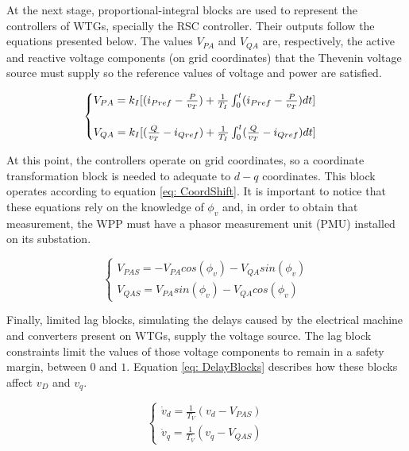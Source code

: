At the next stage, proportional-integral blocks are used to represent the controllers of WTGs, specially the RSC controller. Their outputs follow the equations presented below. The values $V_{PA}$ and $V_{QA}$ are, respectively, the active and reactive voltage components (on grid coordinates) that the Thevenin voltage source must supply so the reference values of voltage and power are satisfied.

\begin{equation}
	\begin{cases}
		V_{PA} = k_{I}[(i_{Pref} - \frac{P}{v_{T}}) + \frac{1}{T_{I}}\int\displaylimits_{0}^{t} (i_{Pref} - \frac{P}{v_{T}})dt]\\
		\\
		V_{QA} = k_{I}[(\frac{Q}{v_{T}} - i_{Qref}) + \frac{1}{T_{I}}\int\displaylimits_{0}^{t} (\frac{Q}{v_{T}} - i_{Qref})dt]
	\end{cases}
	\label{eq: PI}
\end{equation}

At this point, the controllers operate on grid coordinates, so a coordinate transformation block is needed to adequate to $d-q$ coordinates. This block operates according to equation \eqref{eq: CoordShift}. It is important to notice that these equations rely on the knowledge of $\phi_{v}$ and, in order to obtain that measurement, the WPP must have a phasor measurement unit (PMU) installed on its substation.

\begin{equation}
	\begin{cases}
		V_{PAS} = -V_{PA}cos(\phi_{v}) - V_{QA}sin(\phi_{v}) \\
		V_{QAS} = V_{PA}sin(\phi_{v}) - V_{QA}cos(\phi_{v})
	\end{cases}
	\label{eq: CoordShift}
\end{equation}

Finally, limited lag blocks, simulating the delays caused by the electrical machine and converters present on WTGs, supply the voltage source. The lag block constraints limit the values of those voltage components to remain in a safety margin, between $0$ and $1$. Equation \eqref{eq: DelayBlocks} describes how these blocks affect $v_{D}$ and $v_{q}$.

\begin{equation}
	\begin{cases}
		\dot{v}_{d} = \frac{1}{T_{V}}(v_{d} - V_{PAS}) \\
		\dot{v}_{q} = \frac{1}{T_{V}}(v_{q} - V_{QAS})
	\end{cases}
	\label{eq: DelayBlocks}
\end{equation}

